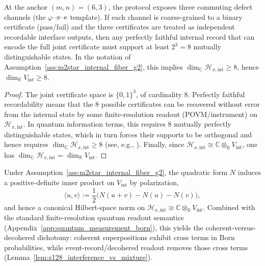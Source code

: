\begin{lemma}[Three-channel independence yields an eight-state minimal record at the $m=6,n=3$ anchor]
\label{lem:three_channel_8_state_minimal_record}
At the anchor $(m,n)=(6,3)$, the protocol exposes three commuting defect channels (the $\varphi$--$\pi$--$\mathrm{e}$ template).
If each channel is coarse-grained to a binary certificate (pass/fail) and the three certificates are treated as independent recordable interface outputs, then any perfectly faithful internal record that can encode the full joint certificate must support at least $2^3=8$ mutually distinguishable states.
In the notation of Assumption~\ref{ass:m2star_internal_fiber_g2}, this implies $\dim_{\mathbb{C}}\mathcal{H}_{x,\mathrm{int}}\ge 8$, hence $\dim_{\mathbb{R}}V_{\mathrm{int}}\ge 8$.
\end{lemma}
\begin{proof}
The joint certificate space is $\{0,1\}^3$, of cardinality $8$.
Perfectly faithful recordability means that the $8$ possible certificates can be recovered without error from the internal state by some finite-resolution readout (POVM/instrument) on $\mathcal{H}_{x,\mathrm{int}}$.
In quantum information terms, this requires $8$ mutually perfectly distinguishable states, which in turn forces their supports to be orthogonal and hence requires $\dim_{\mathbb{C}}\mathcal{H}_{x,\mathrm{int}}\ge 8$ (see, e.g., \cite{NielsenChuang2000}).
Finally, since $\mathcal{H}_{x,\mathrm{int}}\cong \mathbb{C}\otimes_{\mathbb{R}}V_{\mathrm{int}}$, one has $\dim_{\mathbb{C}}\mathcal{H}_{x,\mathrm{int}}=\dim_{\mathbb{R}}V_{\mathrm{int}}$.
\end{proof}

\begin{proposition}
\label{prop:qcomp_implies_qwave_weak}
Under Assumption~\ref{ass:m2star_internal_fiber_g2}, the quadratic form $N$ induces a positive-definite inner product on $V_{\mathrm{int}}$ by polarization,
\[
\langle u,v\rangle := \frac{1}{2}\bigl(N(u+v)-N(u)-N(v)\bigr),
\]
and hence a canonical Hilbert-space norm on $\mathcal{H}_{x,\mathrm{int}}\cong \mathbb{C}\otimes_{\mathbb{R}}V_{\mathrm{int}}$.
Combined with the standard finite-resolution quantum readout semantics (Appendix~\ref{app:quantum_measurement_born}), this yields the coherent-versus-decohered dichotomy: coherent superpositions exhibit cross terms in Born probabilities, while event-record/decohered readout removes those cross terms (Lemma~\ref{lem:z128_interference_vs_mixture}).
\end{proposition}

